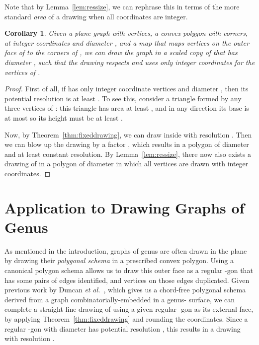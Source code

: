 \documentclass[11pt]{article}
\newtheorem {corollary} {Corollary}
\begin{document}
    Note that by Lemma~\ref {lem:ressize}, we can rephrase this in terms of the
    more standard \emph {area} of a drawing when all coordinates are integer.

    \begin {corollary}
      Given a plane graph  with  vertices, a convex polygon  with  corners,
      at integer coordinates and diameter , and a map  that maps 
      vertices on the outer face of  to the  corners of ,
      we can draw the graph  in a scaled copy  of  that has diameter , such that the drawing 
      respects  and uses only integer coordinates for the vertices of .
\end {corollary}

    \begin {proof}
      First of all, if  has only integer coordinate vertices and diameter ,
      then its potential resolution is at least . To see this, consider
      a triangle formed by any three vertices of : this triangle has area at
      least , and in any direction its base is at most  so its height
      must be at least .

      Now, by Theorem~\ref {thm:fixeddrawing}, we can draw  inside  with
      resolution . Then we can blow up the drawing by
      a factor , which results in a polygon of diameter 
      and at least constant resolution. By Lemma~\ref {lem:ressize}, there now also
      exists a drawing of  in a polygon  of diameter 
      in which all vertices are drawn with integer coordinates.
    \end {proof}


\section {Application to Drawing Graphs of Genus }

  As mentioned in the introduction,
  graphs of genus  are often drawn in the plane by drawing their \emph {polygonal schema} in a
  prescribed convex polygon. Using a canonical polygon schema
  allows us to draw this outer face
  as a
  regular -gon that has some pairs of edges identified,
  and vertices on those edges
  duplicated.
  Given previous work by Duncan {\it et al.}~\cite{duncan},
  which gives us a chord-free polygonal schema derived from a graph
   combinatorially-embedded in a genus- surface, we can
  complete a straight-line drawing of  using a given regular -gon as
  its external face, by
  applying Theorem~\ref {thm:fixeddrawing} and rounding the
  coordinates.
  Since a regular -gon with diameter  has potential resolution , this results in a
  drawing with resolution .
\end{document}

